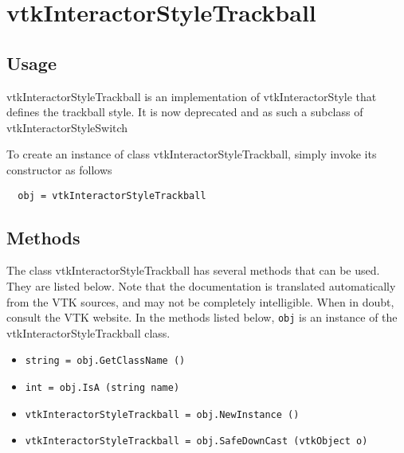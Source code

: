 \section{vtkInteractorStyleTrackball}

\subsection{Usage}

 vtkInteractorStyleTrackball is an implementation of vtkInteractorStyle
 that defines the trackball style. It is now deprecated and as such a
 subclass of vtkInteractorStyleSwitch

To create an instance of class vtkInteractorStyleTrackball, simply
invoke its constructor as follows
\begin{verbatim}
  obj = vtkInteractorStyleTrackball
\end{verbatim}
\subsection{Methods}

The class vtkInteractorStyleTrackball has several methods that can be used.
  They are listed below.
Note that the documentation is translated automatically from the VTK sources,
and may not be completely intelligible.  When in doubt, consult the VTK website.
In the methods listed below, \verb|obj| is an instance of the vtkInteractorStyleTrackball class.
\begin{itemize}
\item  \verb|string = obj.GetClassName ()|

\item  \verb|int = obj.IsA (string name)|

\item  \verb|vtkInteractorStyleTrackball = obj.NewInstance ()|

\item  \verb|vtkInteractorStyleTrackball = obj.SafeDownCast (vtkObject o)|

\end{itemize}
